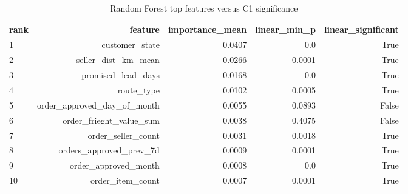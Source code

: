 \begin{table}[htbp]
\centering
\small
\caption{Random Forest top features versus C1 significance}
\begin{tabular}{lrrrr}
\toprule
rank & feature & importance\_mean & linear\_min\_p & linear\_significant \\
\midrule
1 & customer\_state & 0.0407 & 0.0 & True \\
2 & seller\_dist\_km\_mean & 0.0266 & 0.0001 & True \\
3 & promised\_lead\_days & 0.0168 & 0.0 & True \\
4 & route\_type & 0.0102 & 0.0005 & True \\
5 & order\_approved\_day\_of\_month & 0.0055 & 0.0893 & False \\
6 & order\_frieght\_value\_sum & 0.0038 & 0.4075 & False \\
7 & order\_seller\_count & 0.0031 & 0.0018 & True \\
8 & orders\_approved\_prev\_7d & 0.0009 & 0.0001 & True \\
9 & order\_approved\_month & 0.0008 & 0.0 & True \\
10 & order\_item\_count & 0.0007 & 0.0001 & True \\
\bottomrule
\end{tabular}
\par\smallskip\begin{minipage}{\linewidth}\footnotesize \end{minipage}
\end{table}

